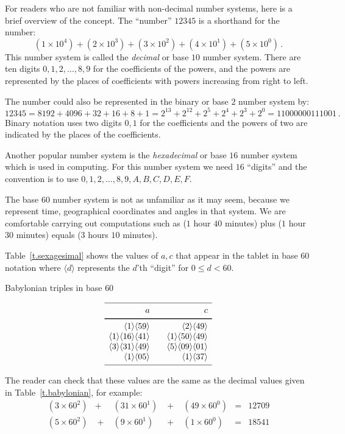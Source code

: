 For readers who are not familiar with non-decimal number systems,  here is a brief overview of the concept. The ``number'' $12345$ is a shorthand for the number:
\[
(1\times 10^4) + (2\times 10^3) + (3\times 10^2) + (4\times 10^1) + (5\times 10^0)\,.
\]
This number system is called the \emph{decimal} or base $10$ number system. There are ten digits $0,1,2,\ldots,8,9$ for the coefficients of the powers, and the powers are represented by the places of coefficients with powers increasing from right to left. 

The number could also be represented in the binary or base $2$ number system by:
\[
12345=8192 + 4096 + 32+16+8+1=
2^{13} + 2^{12} + 2^{5} + 2^{4} + 2^{3} + 2^0=11000000111001\,.
\]
Binary notation uses two digits $0,1$ for the coefficients and the powers of two are indicated by the places of the coefficients.

Another popular number system is the \emph{hexadecimal} or base $16$ number system which is used in computing. For this number system we need $16$ ``digits'' and the convention is to use $0,1,2,\ldots,8,9,A,B,C,D,E,F$.

The base $60$ number system is not as unfamiliar as it may seem, because we represent time, geographical coordinates and angles in that system. We are comfortable carrying out computations such as ($1$ hour $40$ minutes) plus ($1$ hour $30$ minutes) equals ($3$ hours $10$ minutes).

Table~\ref{t.sexagesimal} shows the values of $a,c$ that appear in the tablet in base $60$ notation where $\langle d\rangle$ represents the $d$'th ``digit'' for $0\leq d<60$.
\begin{table}[t]
\caption{Babylonian triples in base $60$}\label{t.sexagesimal}
\[
\begin{array}{r@{$\quad\quad$}r}
\hline
\noalign{\smallskip}
a&c\\
\noalign{\smallskip}\svhline\noalign{\smallskip}
\langle 1\rangle \langle 59 \rangle&\langle 2\rangle \langle 49 \rangle\\
\langle 1\rangle \langle 16 \rangle\langle 41\rangle&\langle 1\rangle \langle 50 \rangle\langle 49\rangle\\
\langle 3\rangle \langle 31 \rangle\langle 49\rangle&\langle 5\rangle \langle 09 \rangle\langle 01\rangle\\
\langle 1\rangle \langle 05 \rangle&\langle 1\rangle \langle 37 \rangle\\
\noalign{\smallskip}\hline
\end{array}
\]
\end{table}
The reader can check that these values are the same as the decimal values given in Table~\ref{t.babylonian}, for example:
\[
\renewcommand{\arraystretch}{1.3}
\begin{array}{lclclcr}
(3\times 60^2) &+& (31\times 60^1) &\;+\;& (49\times 60^0) &=&   12709\\
(5\times 60^2) &\;+\;& (9\times 60^1) &\;+\;& (1\times 60^0) &=& 18541
\end{array}
\]

